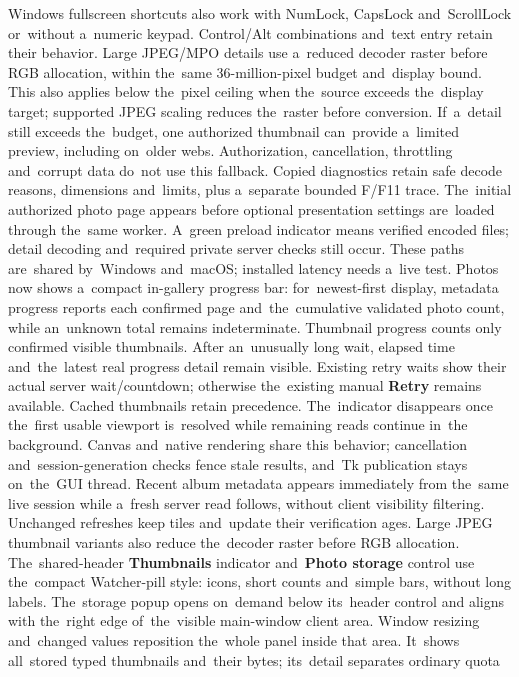 \documentclass[11pt,a4paper]{article}
\newcommand{\ui}[1]{\textbf{#1}}
\begin{document}
Windows fullscreen shortcuts also work with NumLock, CapsLock and~ScrollLock
or~without a~numeric keypad. Control/Alt combinations and~text entry retain
their behavior. Large JPEG/MPO details use a~reduced decoder raster before
RGB allocation, within the~same 36-million-pixel budget and~display bound.
This also applies below the~pixel ceiling when the~source exceeds the~display
target; supported JPEG scaling reduces the~raster before conversion.
If~a~detail still exceeds the~budget, one authorized thumbnail can~provide
a~limited preview, including on~older webs. Authorization, cancellation,
throttling and~corrupt data do~not use this fallback. Copied diagnostics retain
safe decode reasons, dimensions and~limits, plus a~separate bounded F/F11 trace.
The~initial authorized photo page appears before optional presentation settings
are~loaded through the~same worker. A~green preload indicator means verified
encoded files; detail decoding and~required private server checks still occur.
These paths are~shared by~Windows and~macOS; installed latency needs a~live test.
Photos now shows a~compact in-gallery progress bar: for~newest-first display,
metadata progress reports each confirmed page and~the~cumulative validated
photo count, while an~unknown total remains indeterminate. Thumbnail progress
counts only confirmed visible thumbnails. After an~unusually long wait,
elapsed time and~the~latest
real progress detail remain visible. Existing retry waits show their actual
server wait/countdown; otherwise the~existing manual \ui{Retry} remains
available. Cached thumbnails retain precedence. The~indicator disappears once
the~first usable viewport is~resolved while remaining reads continue in~the
background. Canvas and~native rendering share this behavior; cancellation
and~session-generation checks fence stale results, and~Tk publication stays
on~the~GUI thread.
Recent album metadata appears immediately from the~same live session while
a~fresh server read follows, without client visibility filtering. Unchanged
refreshes keep tiles and~update their verification ages. Large JPEG thumbnail
variants also reduce the~decoder raster before RGB allocation.
The~shared-header \ui{Thumbnails} indicator and~\ui{Photo storage} control use
the~compact Watcher-pill style: icons, short counts and~simple bars, without
long labels. The~storage popup opens on~demand below its~header control and
aligns with the~right edge of~the~visible main-window client area. Window
resizing and~changed values reposition the~whole panel inside that area.
It~shows
all~stored typed thumbnails and~their bytes; its~detail separates ordinary quota
\end{document}
